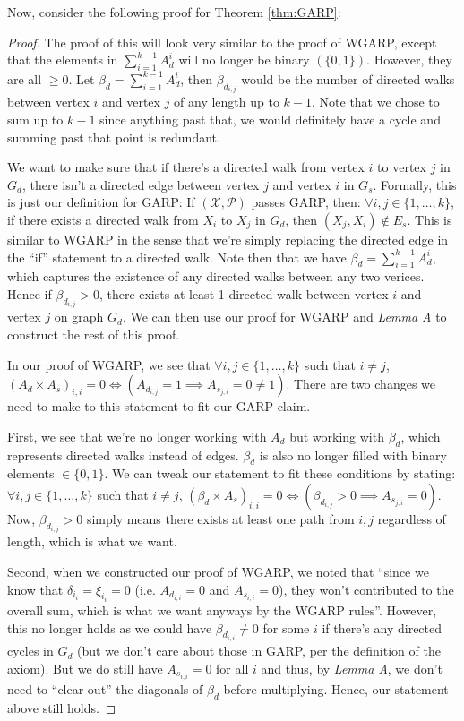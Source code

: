\documentclass{article} %
\theoremstyle{style1}
\theoremstyle{example}
\begin{document}
Now, consider the following proof for Theorem \ref{thm:GARP}:
\begin{proof}
The proof of this will look very similar to the proof of WGARP, except that the elements in $\sum_{i=1}^{k-1}A_{d}^{i}$ will no longer be binary $(\{0,1\})$. However, they are all $\geq0$. Let $\beta_d=\sum_{i=1}^{k-1}A_{d}^{i}$, then $\beta_{d_{i,j}}$ would be the number of directed walks between vertex $i$ and vertex $j$ of any length up to $k-1$. Note that we chose to sum up to $k-1$ since anything past that, we would definitely have a cycle and summing past that point is redundant.


We want to make sure that if there's a directed walk from vertex $i$ to vertex $j$ in $G_d$, there isn't a directed edge between vertex $j$ and vertex $i$ in $G_s$. Formally, this is just our definition for GARP: If $(\mathcal{X},\mathcal{P})$ passes GARP, then: $\forall i,j\in\{1,\dots,k\}$, if there exists a directed walk from $X_i$ to $X_j$ in $G_d$, then $(X_j,X_i)\not\in E_s$. This is similar to WGARP in the sense that we're simply replacing the directed edge in the ``if'' statement to a directed walk. Note then that we have $\beta_d=\sum_{i=1}^{k-1}A_{d}^{i}$, which captures the existence of any directed walks between any two verices. Hence if $\beta_{d_{i,j}}>0$, there exists at least 1 directed walk between vertex $i$ and vertex $j$ on graph $G_d$. We can then use our proof for WGARP and \textit{Lemma A} to construct the rest of this proof.


In our proof of WGARP, we see that $\forall i, j\in\{1,\ldots,k\}$ such that $i\not=j$, $(A_d\times A_s)_{i,i}=0 \iff (A_{d_{i,j}}=1 \implies A_{s_{j,i}}=0\not=1)$. There are two changes we need to make to this statement to fit our GARP claim. 

First, we see that we're no longer working with $A_d$ but working with $\beta_d$, which represents directed walks instead of edges. $\beta_d$ is also no longer filled with binary elements $\in\{0,1\}$. We can tweak our statement to fit these conditions by stating: $\forall i, j\in\{1,\ldots,k\}$ such that $i\not=j$, $(\beta_d\times A_s)_{i,i}=0 \iff (\beta_{d_{i,j}}>0 \implies A_{s_{j,i}}=0)$. Now, $\beta_{d_{i,j}}>0$ simply means there exists at least one path from $i,j$ regardless of length, which is what we want.

Second, when we constructed our proof of WGARP, we noted that ``since we know that $\delta_{i_i}=\xi_{i_i}=0$ (i.e. $A_{d_{i,i}}=0$ and $A_{s_{i,i}}=0$), they won't contributed to the overall sum, which is what we want anyways by the WGARP rules''. However, this no longer holds as we could have $\beta_{d_{i,i}}\not=0$ for some $i$ if there's any directed cycles in $G_d$ (but we don't care about those in GARP, per the definition of the axiom). But we do still have $A_{s_{i,i}}=0$ for all $i$ and thus, by \textit{Lemma A}, we don't need to ``clear-out'' the diagonals of $\beta_d$ before multiplying. Hence, our statement above still holds. 


\end{proof}
\end{document}
